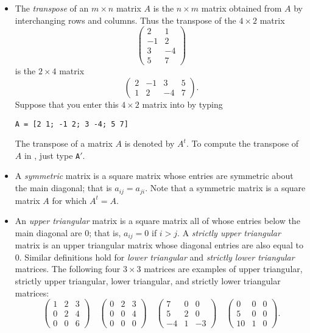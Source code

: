 \documentclass{ximera}
\begin{document}
\begin{itemize}
\item The {\em transpose\/} of an $m\times n$
matrix $A$ is the $n\times m$ matrix obtained from $A$ by
interchanging rows and columns.  Thus the transpose of the
$4\times 2$ matrix
\[
\left(\begin{array}{rr} 2 & 1 \\ -1 & 2 \\ 3 & -4 \\ 5 & 7
\end{array}\right)
\]
is the $2\times 4$ matrix
\[
\left(\begin{array}{rrrr} 2 & -1 & 3 & 5 \\ 1 & 2 & -4 & 7
\end{array}\right).
\]
Suppose that you enter this $4\times 2$ matrix into \Matlab by
typing
\begin{verbatim}
A = [2 1; -1 2; 3 -4; 5 7]
\end{verbatim}
The transpose of a matrix $A$ is denoted by $A^t$.  To compute
the transpose of $A$ in \Matlabp, just type {\tt A$'$}.

\item A {\em symmetric\/} matrix is a
square matrix whose entries are symmetric about the main
diagonal; that is $a_{ij}=a_{ji}$.  Note that a symmetric matrix
is a square matrix $A$ for which $A^t=A$.

\item An {\em upper triangular\/} matrix is a square matrix all of whose entries below the
main diagonal are $0$; that is, $a_{ij}=0$ if $i>j$.  A {\em
strictly upper triangular\/} matrix is an upper triangular
matrix whose diagonal entries are also equal to $0$.  Similar
definitions hold for {\em lower triangular\/}
and {\em strictly lower triangular\/} matrices.  The following four 
$3\times 3$ matrices are examples of upper triangular, strictly upper 
triangular, lower triangular, and strictly lower triangular matrices:
\[
\left(\begin{array}{rrr} 1 & 2 & 3\\ 0 & 2 & 4\\ 0 & 0 & 6\end{array}\right)
\quad
\left(\begin{array}{rrr} 0 & 2 & 3\\ 0 & 0 & 4\\ 0 & 0 & 0\end{array}\right)
\quad
\left(\begin{array}{rrr} 7 & 0 & 0\\ 5 & 2 & 0\\ -4 & 1 & -3\end{array}\right)
\quad
\left(\begin{array}{rrr} 0 & 0 & 0\\ 5 & 0 & 0\\ 10 & 1 & 0\end{array}\right).
\]


\end{itemize}
\end{document}
